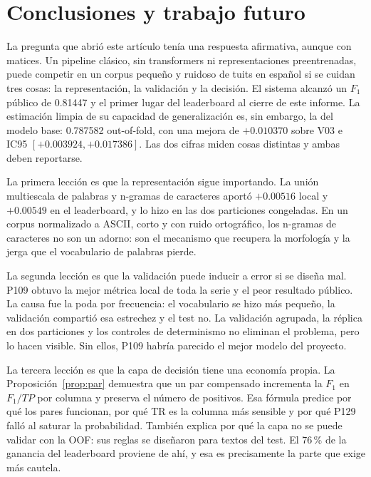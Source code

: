 \section{Conclusiones y trabajo futuro}
\label{sec:conclusiones}

La pregunta que abrió este artículo tenía una respuesta afirmativa, aunque
con matices. Un pipeline clásico, sin transformers ni representaciones
preentrenadas, puede competir en un corpus pequeño y ruidoso de tuits en
español si se cuidan tres cosas: la representación, la validación y la
decisión. El sistema alcanzó un $F_1$ público de 0.81447 y el primer lugar
del leaderboard al cierre de este informe. La estimación limpia de su
capacidad de generalización es, sin embargo, la del modelo base: 0.787582
out-of-fold, con una mejora de $+0.010370$ sobre V03 e IC95
$[+0.003924, +0.017386]$. Las dos cifras miden cosas distintas y ambas deben
reportarse.

La primera lección es que la representación sigue importando. La unión
multiescala de palabras y n-gramas de caracteres aportó $+0.00516$ local y
$+0.00549$ en el leaderboard, y lo hizo en las dos particiones congeladas.
En un corpus normalizado a ASCII, corto y con ruido ortográfico, los
n-gramas de caracteres no son un adorno: son el mecanismo que recupera la
morfología y la jerga que el vocabulario de palabras pierde.

La segunda lección es que la validación puede inducir a error si se diseña mal. P109
obtuvo la mejor métrica local de toda la serie y el peor resultado público.
La causa fue la poda por frecuencia: el vocabulario se hizo más pequeño,
la validación compartió esa estrechez y el test no. La validación agrupada,
la réplica en dos particiones y los controles de determinismo no eliminan el
problema, pero lo hacen visible. Sin ellos, P109 habría parecido el mejor
modelo del proyecto.

La tercera lección es que la capa de decisión tiene una economía propia. La
Proposición~\ref{prop:par} demuestra que un par compensado incrementa la
$F_1$ en $F_1/TP$ por columna y preserva el número de positivos. Esa fórmula
predice por qué los pares funcionan, por qué TR es la columna más sensible y
por qué P129 falló al saturar la probabilidad. También explica por qué la
capa no se puede validar con la OOF: sus reglas se diseñaron para textos del
test. El 76\,\% de la ganancia del leaderboard proviene de ahí, y esa es
precisamente la parte que exige más cautela.

